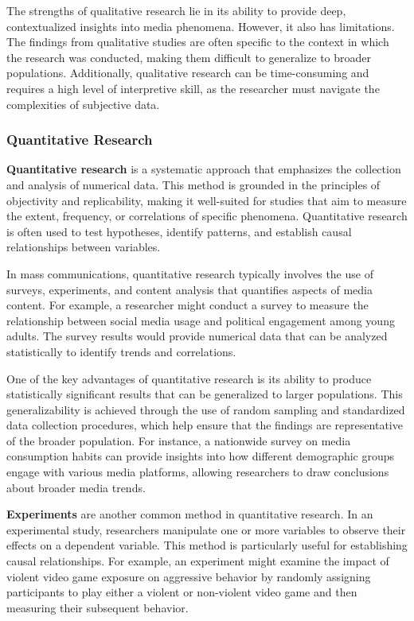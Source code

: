 \documentclass[
]{book}
\begin{document}
The strengths of qualitative research lie in its ability to provide deep, contextualized insights into media phenomena. However, it also has limitations. The findings from qualitative studies are often specific to the context in which the research was conducted, making them difficult to generalize to broader populations. Additionally, qualitative research can be time-consuming and requires a high level of interpretive skill, as the researcher must navigate the complexities of subjective data.

\subsubsection*{Quantitative Research}\label{quantitative-research}

\textbf{Quantitative research} is a systematic approach that emphasizes the collection and analysis of numerical data. This method is grounded in the principles of objectivity and replicability, making it well-suited for studies that aim to measure the extent, frequency, or correlations of specific phenomena. Quantitative research is often used to test hypotheses, identify patterns, and establish causal relationships between variables.

In mass communications, quantitative research typically involves the use of surveys, experiments, and content analysis that quantifies aspects of media content. For example, a researcher might conduct a survey to measure the relationship between social media usage and political engagement among young adults. The survey results would provide numerical data that can be analyzed statistically to identify trends and correlations.

One of the key advantages of quantitative research is its ability to produce statistically significant results that can be generalized to larger populations. This generalizability is achieved through the use of random sampling and standardized data collection procedures, which help ensure that the findings are representative of the broader population. For instance, a nationwide survey on media consumption habits can provide insights into how different demographic groups engage with various media platforms, allowing researchers to draw conclusions about broader media trends.

\textbf{Experiments} are another common method in quantitative research. In an experimental study, researchers manipulate one or more variables to observe their effects on a dependent variable. This method is particularly useful for establishing causal relationships. For example, an experiment might examine the impact of violent video game exposure on aggressive behavior by randomly assigning participants to play either a violent or non-violent video game and then measuring their subsequent behavior.
\end{document}

